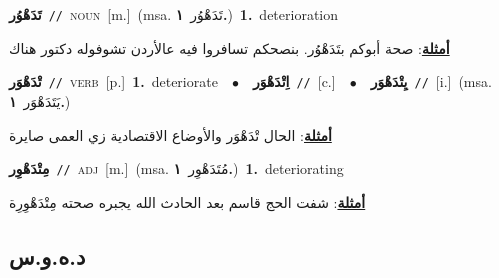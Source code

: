 \documentclass[10pt,a4paper,twoside]{article} %
\begin{document}
\begin{multicols}{2}
{\setlength\topsep{0pt}\textbf{\foreignlanguage{arabic}{تَدَهْوُر}}\ {\color{gray}\texttt{//}\color{black}}\ \textsc{noun}\ [m.]\ \color{gray}(msa. \foreignlanguage{arabic}{تَدَهْوُر}~\foreignlanguage{arabic}{\textbf{١.}})\color{black}\ \textbf{1.}~deterioration\  \begin{flushright}\color{gray}\foreignlanguage{arabic}{\textbf{\underline{\foreignlanguage{arabic}{أمثلة}}}: صحة أبوكم بتَدَهْوُر. بنصحكم تسافروا فيه عالأردن تشوفوله دكتور هناك}\end{flushright}\color{black}} \vspace{2mm}

{\setlength\topsep{0pt}\textbf{\foreignlanguage{arabic}{تْدَهْوَر}}\ {\color{gray}\texttt{//}\color{black}}\ \textsc{verb}\ [p.]\ \textbf{1.}~deteriorate\ \ $\bullet$\ \ \setlength\topsep{0pt}\textbf{\foreignlanguage{arabic}{اِتْدَهْوَر}}\ {\color{gray}\texttt{//}\color{black}}\ [c.]\ \ $\bullet$\ \ \setlength\topsep{0pt}\textbf{\foreignlanguage{arabic}{يِتْدَهْوَر}}\ {\color{gray}\texttt{//}\color{black}}\ [i.]\ \color{gray}(msa. \foreignlanguage{arabic}{يَتَدَهْوَر}~\foreignlanguage{arabic}{\textbf{١.}})\color{black}\  \begin{flushright}\color{gray}\foreignlanguage{arabic}{\textbf{\underline{\foreignlanguage{arabic}{أمثلة}}}: الحال تْدَهْوَر والأوضاع الاقتصادية زي العمى صايرة}\end{flushright}\color{black}} \vspace{2mm}

{\setlength\topsep{0pt}\textbf{\foreignlanguage{arabic}{مِتْدَهْوِر}}\ {\color{gray}\texttt{//}\color{black}}\ \textsc{adj}\ [m.]\ \color{gray}(msa. \foreignlanguage{arabic}{مُتَدَهْوِر}~\foreignlanguage{arabic}{\textbf{١.}})\color{black}\ \textbf{1.}~deteriorating\  \begin{flushright}\color{gray}\foreignlanguage{arabic}{\textbf{\underline{\foreignlanguage{arabic}{أمثلة}}}: شفت الحج قاسم بعد الحادث الله يجبره صحته مِتْدَهْوِرِة}\end{flushright}\color{black}} \vspace{2mm}

\vspace{-3mm}
\subsection*{\color{blue}\foreignlanguage{arabic}{د.ه.و.س}\color{blue}{}} 


\end{multicols}
\end{document}
